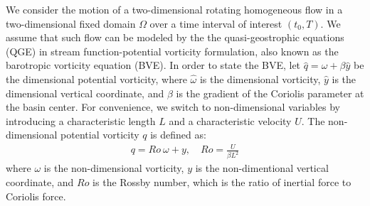 \documentclass[11pt,a4paper]{article}
\begin{document}
We consider the motion of a two-dimensional rotating 
homogeneous flow in a two-dimensional fixed domain $\Omega$ 
over a time interval of interest $(t_0, T)$. We assume that such flow can be modeled by the 
the quasi-geostrophic equations (QGE) in stream function-potential vorticity formulation, also known as the
barotropic vorticity equation (BVE).
In order to state the BVE, let $\hat{q} =  \hat{\omega} + \beta \hat{y}$ be the dimensional potential vorticity, where 
$\hat{\omega}$ is the dimensional vorticity,  $\hat{y}$ is the dimensional vertical coordinate, and $\beta$
is the gradient of the Coriolis parameter at the basin center. For convenience, we switch to 
non-dimensional variables by introducing a characteristic length $L$ and a characteristic velocity $U$. 
The non-dimensional potential vorticity $q$ is defined as:
\begin{align}
q = Ro~\omega + y, \quad  Ro = \frac{U}{\beta L^2}\label{eq:BV2}
\end{align}
where $\omega$ is the non-dimensional vorticity, $y$ is the non-dimentional vertical coordinate,
and $Ro$ is the Rossby number, which is the ratio of inertial force to Coriolis force. 
\end{document}
